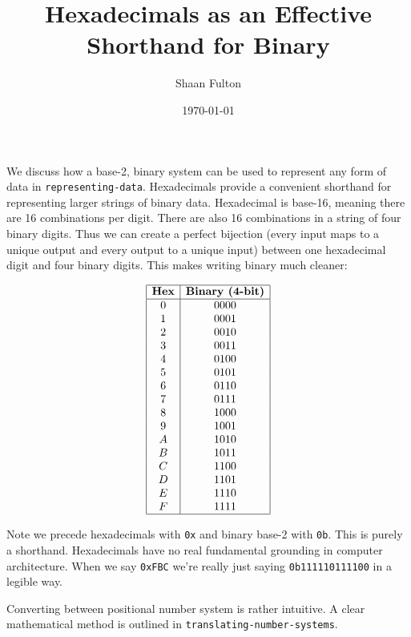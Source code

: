 \documentclass[12pt]{article}
\title{Hexadecimals as an Effective Shorthand for Binary}
\author{Shaan Fulton}
\date{\today}
\begin{document}
\maketitle

We discuss how a base-2, binary system can be used to represent any form of data in \texttt{representing-data}. Hexadecimals provide a convenient shorthand for representing larger strings of binary data. Hexadecimal is base-16, meaning there are 16 combinations per digit. There are also 16 combinations in a string of four binary digits. Thus we can create a perfect bijection (every input maps to a unique output and every output to a unique input) between one hexadecimal digit and four binary digits. This makes writing binary much cleaner:

\[
\begin{array}{|c|c|}
\hline
\textbf{Hex} & \textbf{Binary (4-bit)} \\
\hline
0 & 0000 \\
1 & 0001 \\
2 & 0010 \\
3 & 0011 \\
4 & 0100 \\
5 & 0101 \\
6 & 0110 \\
7 & 0111 \\
8 & 1000 \\
9 & 1001 \\
A & 1010 \\
B & 1011 \\
C & 1100 \\
D & 1101 \\
E & 1110 \\
F & 1111 \\
\hline
\end{array}
\]

Note we precede hexadecimals with \texttt{0x} and binary base-2 with \texttt{0b}. This is purely a shorthand. Hexadecimals have no real fundamental grounding in computer architecture. When we say \texttt{0xFBC} we're really just saying \texttt{0b111110111100} in a legible way.

Converting between positional number system is rather intuitive. A clear mathematical method is outlined in \texttt{translating-number-systems}.
\end{document}
